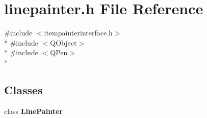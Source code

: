 \section{linepainter.\+h File Reference}
\label{bk3_2curve_2painters_2linepainter_8h}
{\ttfamily \#include $<$itempainterinterface.\+h$>$}\\*
{\ttfamily \#include $<$Q\+Object$>$}\\*
{\ttfamily \#include $<$Q\+Pen$>$}\\*
\subsection*{Classes}
\begin{DoxyCompactItemize}
\item 
class {\bf Line\+Painter}
\end{DoxyCompactItemize}
